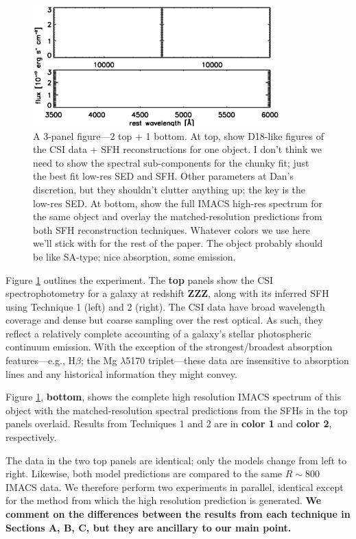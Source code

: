 \documentclass[a4paper,fleqn,usenatbib]{mnras}
\newcommand{\resp}{respectively}
\newcommand{\bfr}{\bf\color{red}}
\newcommand{\bfb}{\color{myblue}}
\begin{document}
\begin{figure}
	\centering
	\includegraphics[width=0.85\textwidth]{scheme}
	\caption{\bfb A 3-panel figure---2 top + 1 bottom. At top, show D18-like figures of the CSI
			data + SFH reconstructions for one object. I don't think we need to show the spectral
			sub-components for the chunky fit; just the best fit low-res SED and SFH. Other parameters
			at Dan's discretion, but they shouldn't clutter anything up; the key is the low-res SED.
			At bottom, show the full IMACS high-res spectrum for the same object and overlay the
			matched-resolution predictions from both SFH reconstruction techniques. Whatever
			colors we use here we'll stick with for the rest of the paper. The object probably should
			be like SA-type; nice absorption, some emission.}
	\label{fig:scheme}
\end{figure}

Figure \ref{fig:scheme} outlines the experiment. The {\bfr top} panels show the
CSI spectrophotometry for a galaxy at redshift {\bfr ZZZ}, along with its inferred SFH using Technique 
1 (left) and 2 (right). The CSI data have broad wavelength 
coverage and dense but coarse sampling over the rest optical. As such, they reflect a relatively
complete accounting of a galaxy's stellar photospheric continuum emission. With the exception of the
strongest/broadest absorption features---e.g., H$\beta$; the Mg $\lambda$5170 triplet---these data are 
insensitive to absorption lines and any historical information they might convey.

Figure \ref{fig:scheme}, {\bfr bottom}, shows the complete high resolution IMACS spectrum of 
this object with the matched-resolution spectral predictions from the SFHs in the top panels overlaid. 
Results from Techniques 1 and 2 are in {\bfr color 1} and {\bfr color 2}, \resp. 

The data in the two top panels are identical; only the models change from left to right. Likewise,
both model predictions are compared to the same $R\sim800$ IMACS data. We therefore perform two 
experiments in parallel, identical except for the method from which the high resolution prediction is 
generated. {\bfr We comment on the differences between the results from each
technique in Sections A, B, C, but they are ancillary to our main point.}
\end{document}
